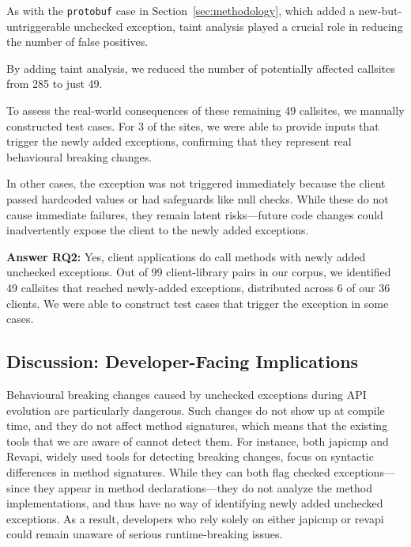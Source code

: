 As with the \texttt{protobuf} case in Section~\ref{sec:methodology}, which added a new-but-untriggerable unchecked exception, taint analysis played a crucial role in reducing the number of false positives.

\vspace{1em}
\begin{tcolorbox}[colback=gray!10, colframe=black]
By adding taint analysis, we reduced the number of potentially affected callsites from 285 to just 49.
\end{tcolorbox}
\vspace{1em}

To assess the real-world consequences of these remaining 49 callsites, we manually constructed test cases. For 3 of the sites, we were able to provide inputs that trigger the newly added exceptions, confirming that they represent real behavioural breaking changes.

In other cases, the exception was not triggered immediately because the client passed hardcoded values or had safeguards like null checks. While these do not cause immediate failures, they remain latent risks—future code changes could inadvertently expose the client to the newly added exceptions.

\vspace{1em}
\begin{tcolorbox}[colback=gray!10, colframe=black]
\textbf{Answer RQ2:} Yes, client applications do call methods with newly added unchecked exceptions. Out of 99 client-library pairs in our corpus, we identified 49 callsites that reached newly-added exceptions, distributed across 6 of our 36 clients. We were able to construct test cases that trigger the exception in some cases.
\end{tcolorbox}
\vspace{1em}

\subsection{Discussion: Developer-Facing Implications}

Behavioural breaking changes caused by unchecked exceptions during API evolution are particularly dangerous. Such changes do not show up at compile time, and they do not affect method signatures, which means that the existing tools that we are aware of cannot detect them. For instance, both japicmp and Revapi, widely used tools for detecting breaking changes, focus on syntactic differences in method signatures. While they can both flag checked exceptions—since they appear in method declarations—they do not analyze the method implementations, and thus have no way of identifying newly added unchecked exceptions. As a result, developers who rely solely on either japicmp or revapi could remain unaware of serious runtime-breaking issues.

